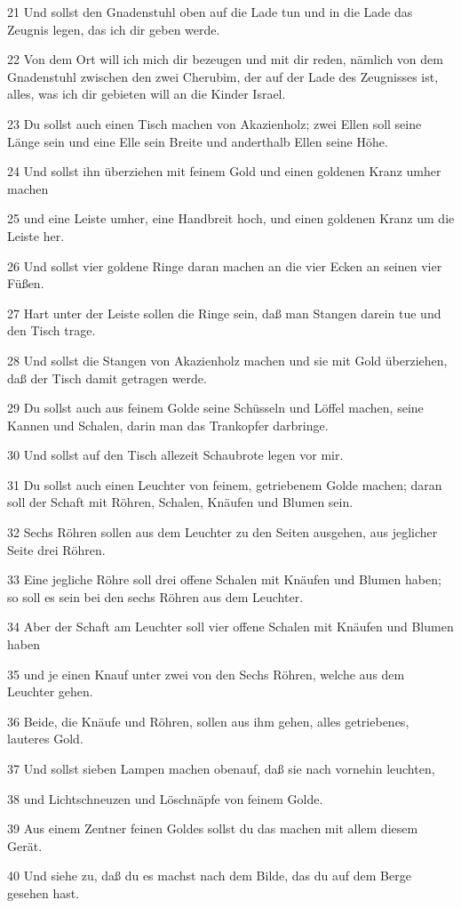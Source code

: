 \par 21 Und sollst den Gnadenstuhl oben auf die Lade tun und in die Lade das Zeugnis legen, das ich dir geben werde.
\par 22 Von dem Ort will ich mich dir bezeugen und mit dir reden, nämlich von dem Gnadenstuhl zwischen den zwei Cherubim, der auf der Lade des Zeugnisses ist, alles, was ich dir gebieten will an die Kinder Israel.
\par 23 Du sollst auch einen Tisch machen von Akazienholz; zwei Ellen soll seine Länge sein und eine Elle sein Breite und anderthalb Ellen seine Höhe.
\par 24 Und sollst ihn überziehen mit feinem Gold und einen goldenen Kranz umher machen
\par 25 und eine Leiste umher, eine Handbreit hoch, und einen goldenen Kranz um die Leiste her.
\par 26 Und sollst vier goldene Ringe daran machen an die vier Ecken an seinen vier Füßen.
\par 27 Hart unter der Leiste sollen die Ringe sein, daß man Stangen darein tue und den Tisch trage.
\par 28 Und sollst die Stangen von Akazienholz machen und sie mit Gold überziehen, daß der Tisch damit getragen werde.
\par 29 Du sollst auch aus feinem Golde seine Schüsseln und Löffel machen, seine Kannen und Schalen, darin man das Trankopfer darbringe.
\par 30 Und sollst auf den Tisch allezeit Schaubrote legen vor mir.
\par 31 Du sollst auch einen Leuchter von feinem, getriebenem Golde machen; daran soll der Schaft mit Röhren, Schalen, Knäufen und Blumen sein.
\par 32 Sechs Röhren sollen aus dem Leuchter zu den Seiten ausgehen, aus jeglicher Seite drei Röhren.
\par 33 Eine jegliche Röhre soll drei offene Schalen mit Knäufen und Blumen haben; so soll es sein bei den sechs Röhren aus dem Leuchter.
\par 34 Aber der Schaft am Leuchter soll vier offene Schalen mit Knäufen und Blumen haben
\par 35 und je einen Knauf unter zwei von den Sechs Röhren, welche aus dem Leuchter gehen.
\par 36 Beide, die Knäufe und Röhren, sollen aus ihm gehen, alles getriebenes, lauteres Gold.
\par 37 Und sollst sieben Lampen machen obenauf, daß sie nach vornehin leuchten,
\par 38 und Lichtschneuzen und Löschnäpfe von feinem Golde.
\par 39 Aus einem Zentner feinen Goldes sollst du das machen mit allem diesem Gerät.
\par 40 Und siehe zu, daß du es machst nach dem Bilde, das du auf dem Berge gesehen hast.

